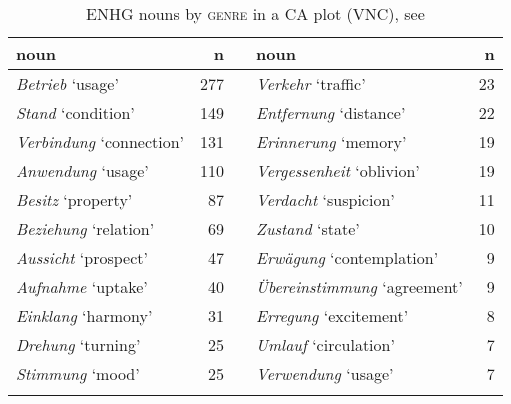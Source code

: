 \documentclass[output=paper,colorlinks,citecolor=brown]{langscibook}
\begin{document}
\begin{table}
\begin{tabularx}{\textwidth}{lr X lr}
\lsptoprule
{noun} &  n && noun & n\\
\midrule
\textit{Betrieb} ‘usage' & 277  &&           \textit{Verkehr} ‘traffic' & 23\\
\textit{Stand} ‘condition' & 149  &&         \textit{Entfernung} ‘distance' & 22\\
\textit{Verbindung} ‘connection' & 131  &&   \textit{Erinnerung} ‘memory' & 19\\
\textit{Anwendung} ‘usage' & 110  &&         \textit{Vergessenheit} ‘oblivion' & 19\\
\textit{Besitz} ‘property' & 87  &&          \textit{Verdacht} ‘suspicion' & 11\\
\textit{Beziehung} ‘relation' & 69  &&       \textit{Zustand} ‘state' & 10\\
\textit{Aussicht} ‘prospect' & 47  &&        \textit{Erwägung} ‘contemplation' & 9\\
\textit{Aufnahme} ‘uptake' & 40  &&          \textit{Übereinstimmung} ‘agreement' & 9\\
\textit{Einklang} ‘harmony' & 31  &&         \textit{Erregung} ‘excitement' & 8\\
\textit{Drehung} ‘turning' & 25  &&          \textit{Umlauf} ‘circulation' & 7\\
\textit{Stimmung} ‘mood' & 25  &&            \textit{Verwendung} ‘usage' & 7\\
\lspbottomrule
\end{tabularx}
  \caption{ENHG nouns by \textsc{genre} in a CA plot (VNC), see }
  \label{tab:fstofig11}
\end{table}
\end{document}
